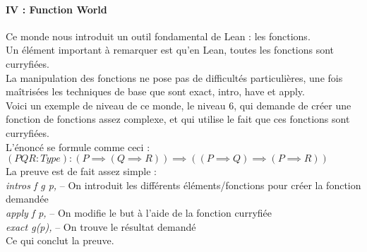 \documentclass[french,frenchkw]{article}
\begin{document}
\paragraph{IV : Function World}
Ce monde nous introduit un outil fondamental de Lean : les fonctions. \\
Un élément important à remarquer est qu'en Lean, toutes les fonctions sont curryfiées.\\
La manipulation des fonctions ne pose pas de difficultés particulières, une fois maîtrisées les techniques de base que sont exact, intro, have et apply.\\
Voici un exemple de niveau de ce monde, le niveau 6, qui demande de créer une fonction de fonctions assez complexe, et qui utilise le fait que ces fonctions sont curryfiées. \\
L'énoncé se formule comme ceci : \\
$(P Q R : Type) : (P \implies (Q \implies R)) \implies ((P \implies Q) \implies (P \implies R))$\\
La preuve est de fait assez simple : \\
\textit{intros f g p,} -- On introduit les différents éléments/fonctions pour créer la fonction demandée \\
\textit{apply f p,} -- On modifie le but à l'aide de la fonction curryfiée \\
\textit{exact g(p),} -- On trouve le résultat demandé \\
Ce qui conclut la preuve.\\
\end{document}
